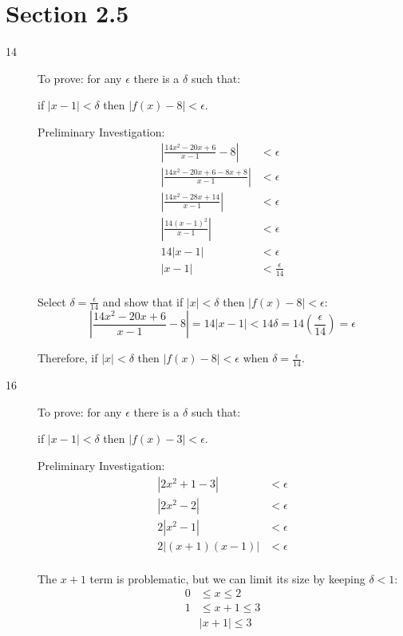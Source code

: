 \documentclass{exam}
\begin{document}
\ifprintanswers


\section{Section 2.5}
\begin{description}
\item[14]
To prove: for any $\epsilon$ there is a $\delta$ such that:

if $|x - 1| < \delta$ then $|f(x) - 8| < \epsilon$.

Preliminary Investigation:
\begin{align*}
  \left| \frac{14x^2-20x+6}{x-1} - 8 \right| &< \epsilon \\
  \left| \frac{14x^2-20x+6 - 8x + 8}{x-1} \right| &< \epsilon \\
  \left| \frac{14x^2-28x+14}{x-1} \right| &< \epsilon \\
  \left| \frac{14(x-1)^2}{x-1} \right| &< \epsilon \\
  14 | x-1 | &< \epsilon \\
  | x-1 | &< \frac{\epsilon}{14} \\
\end{align*}

Select $\delta = \frac{\epsilon}{14}$ and show that if $|x| < \delta$ then $|f(x) - 8| < \epsilon$:
\[
  \left| \frac{14x^2-20x+6}{x-1} - 8 \right| =  14 |x-1| < 14 \delta = 14 \left( \frac{\epsilon}{14} \right) = \epsilon
\]

Therefore, if $|x| < \delta$ then $|f(x) - 8| < \epsilon$ when $\delta = \frac{\epsilon}{14}$.

\item[16]
To prove: for any $\epsilon$ there is a $\delta$ such that:

if $|x - 1| < \delta$ then $|f(x) - 3| < \epsilon$.

Preliminary Investigation:
\begin{align*}
  |2x^2 + 1 - 3| &< \epsilon \\
  |2x^2 -2| &< \epsilon \\
  2|x^2 -1| &< \epsilon \\
  2|(x+1)(x-1)| &< \epsilon \\
\end{align*}

The $x+1$ term is problematic, but we can limit its size by keeping $\delta < 1$:
\begin{align*}
  0 &\leq x \leq 2 \\
  1 &\leq x + 1 \leq 3 \\
  & |x+1| \leq 3 \\
\end{align*}


\end{description}
\end{document}
